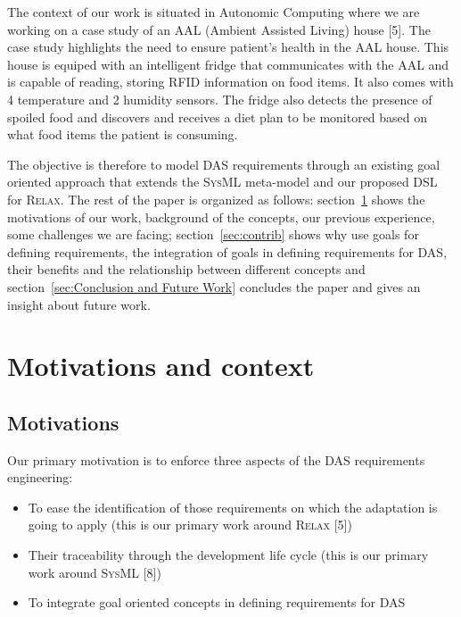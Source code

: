 \documentclass[10pt, conference, compsocconf]{IEEEtran}
\def\myrelax{\textsc{Relax}}                  %
\def\sysml{\textsc{SysML}}
\newcommand{\Mysec}[1]{section~\ref{sec:#1}}
\begin{document}
The context of our work is situated in Autonomic Computing where we are working on a case study of an AAL (Ambient Assisted Living) house [5]. The case study highlights the need to ensure patient's health in the AAL house. This house is equiped with an intelligent fridge that communicates with the AAL and is capable of reading, storing RFID information on food items. It also comes with 4 temperature and 2 humidity sensors. The fridge also detects the presence of spoiled food and discovers and receives a diet plan to be monitored based on what food items the patient is consuming. 

The objective is therefore to model DAS requirements through an existing goal oriented approach that extends the \sysml{} meta-model and our proposed DSL for \myrelax{}.
The rest of the paper is organized as follows: \Mysec{Our Previous Work} shows the motivations of our work, background of the concepts, our previous experience, some challenges we are facing; \Mysec{contrib} shows why use goals for defining requirements, the integration of goals in defining requirements  for DAS, their benefits and the relationship between different concepts and \Mysec{Conclusion and Future Work} concludes the paper and gives an insight about future work.

\section{Motivations and context}\label{sec:Our Previous Work}

\subsection{Motivations}

Our primary motivation is to enforce three aspects of the DAS requirements engineering:
\begin{itemize}
\item To ease the identification of those requirements on which the adaptation is going to apply (this is our primary work around \myrelax{} [5])
\item Their traceability through the development life cycle (this is our primary work around \sysml{} [8])
\item To integrate goal oriented  concepts in defining requirements for DAS
\end{itemize}
\end{document}
